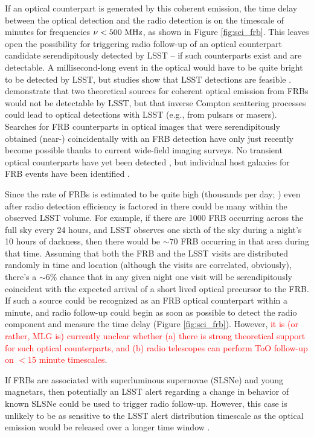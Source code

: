 \documentclass[DM,lsstdraft,authoryear,toc]{lsstdoc}
\begin{document}
If an optical counterpart is generated by this coherent emission, the time delay between the optical detection and the radio detection is on the timescale of minutes for frequencies $\nu < 500\ {\rm MHz}$, as shown in Figure \ref{fig:sci_frb}.
This leaves open the possibility for triggering radio follow-up of an optical counterpart candidate serendipitously detected by LSST -- if such counterparts exist and are detectable.
A millisecond-long event in the optical would have to be quite bright to be detected by LSST, but studies show that LSST detections are feasible \citep{2016ApJ...824L..18L}.
\cite{2019ApJ...878...89Y} demonstrate that two theoretical sources for coherent optical emission from FRBs would not be detectable by LSST, but that inverse Compton scattering processes could lead to optical detections with LSST (e.g., from pulsars or masers).
Searches for FRB counterparts in optical images that were serendipitously obtained (near-) coincidentally with an FRB detection have only just recently become possible thanks to current wide-field imaging surveys.
No transient optical counterparts have yet been detected \citep{2019ApJ...881...30T}, but individual host galaxies for FRB events have been identified \citep{2016Natur.530..453K}.

Since the rate of FRBs is estimated to be quite high (thousands per day; \citealt{2016MNRAS.460L..30C}) even after radio detection efficiency is factored in there could be many within the observed LSST volume. 
For example, if there are 1000 FRB occurring across the full sky every 24 hours, and LSST observes one sixth of the sky during a night's 10 hours of darkness, then there would be $\sim70$ FRB occurring in that area during that time.
Assuming that both the FRB and the LSST visits are distributed randomly in time and location (although the visits are correlated, obviously), there's a $\sim6\%$ chance that in any given night one visit will be serendipitously coincident with the expected arrival of a short lived optical precursor to the FRB.
If such a source could be recognized as an FRB optical counterpart within a minute, and radio follow-up could begin as soon as possible to detect the radio component and measure the time delay (Figure \ref{fig:sci_frb}).  
However, \textcolor{red}{it is (or rather, MLG is) currently unclear whether (a) there is strong theoretical support for such optical counterparts, and (b) radio telescopes can perform ToO follow-up on $<$15 minute timescales}.

If FRBs are associated with superluminous supernovae (SLSNe) and young magnetars, then potentially an LSST alert regarding a change in behavior of known SLSNe could be used to trigger radio follow-up.
However, this case is unlikely to be as sensitive to the LSST alert distribution timescale as the optical emission would be released over a longer time window \citep{2019arXiv191002036L}.
\end{document}
